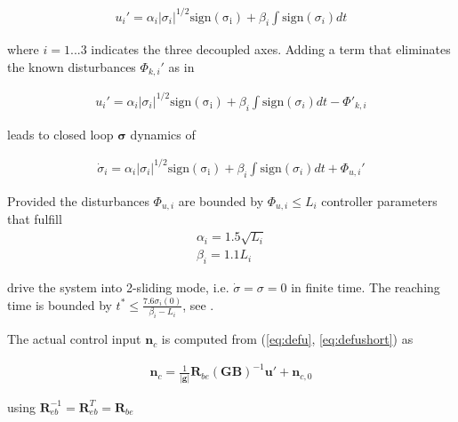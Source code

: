 \documentclass{ifacconf}
\providecommand{\mbf}[1]{\mathbf{#1}}
\begin{document}
\begin{align}
u_i' = \alpha_i |\sigma_i|^{1/2}\mathrm{sign(\sigma_i)} + \beta_i \int \mathrm{sign}(\sigma_i) dt
\end{align}

where $i = 1...3$ indicates the three decoupled axes. Adding a term that eliminates the known disturbances ${\Phi}_{k,i}'$ as in \cite{galzi2006uav}

\begin{align}
u_i' = \alpha_i |\sigma_i|^{1/2}\mathrm{sign(\sigma_i)} + \beta_i \int \mathrm{sign}(\sigma_i) dt - {\Phi}'_{k,i}
\end{align}

leads to closed loop $\mbf{\sigma}$ dynamics of

\begin{align}
\dot{\sigma}_i = \alpha_i |\sigma_i|^{1/2}\mathrm{sign(\sigma_i)} + \beta_i \int \mathrm{sign}(\sigma_i) dt + \Phi_{u,i}'
\end{align}

Provided the disturbances $\Phi_{u,i}$ are bounded by $\Phi_{u,i} \leq L_i$ controller parameters that fulfill
\begin{align}
\alpha_i = 1.5 \sqrt{L_i}\\
\beta_i = 1.1 L_i
\label{eq:csmcgaincondition}
\end{align}

 drive the system into 2-sliding mode, i.e. $\dot{\sigma} = \sigma = 0$ in finite time. The reaching time is bounded by $t^* \leq \frac{7.6 \sigma_i(0)}{\beta_i - L_i}$, see \cite{galzi2006uav}.

The actual control input $\mbf{n}_c$ is computed from (\ref{eq:defu}, \ref{eq:defushort}) as

\begin{align}
\mbf{n}_c = \frac{1}{|\mbf{g}|} \mbf{R}_{be}(\mbf{GB})^{-1} \mbf{u}' + \mbf{n}_{c,0}
\end{align}

using $\mbf{R}_{eb}^{-1} = \mbf{R}_{eb}^{T} = \mbf{R}_{be}$
\end{document}
